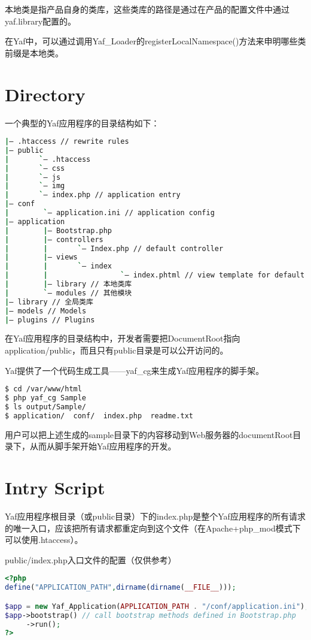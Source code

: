 本地类是指产品自身的类库，这些类库的路径是通过在产品的配置文件中通过yaf.library配置的。

在Yaf中，可以通过调用Yaf\_Loader的registerLocalNamespace()方法来申明哪些类前缀是本地类。



\section{Directory}


一个典型的Yaf应用程序的目录结构如下：

\begin{lstlisting}[language=bash]
|— .htaccess // rewrite rules
|— public
|       `— .htaccess
|       `— css
|       `— js
|       `— img
|       `— index.php // application entry
|— conf
|        `— application.ini // application config
|— application
|        |— Bootstrap.php
|        |— controllers
|        |       `— Index.php // default controller
|        |— views
|        |       `— index
|        |                 `— index.phtml // view template for default action
|        |— library // 本地类库
|        `— modules // 其他模块
|— library // 全局类库
|— models // Models
|— plugins // Plugins
\end{lstlisting}

在Yaf应用程序的目录结构中，开发者需要把DocumentRoot指向application/public，而且只有public目录是可以公开访问的。

Yaf提供了一个代码生成工具——yaf\_cg来生成Yaf应用程序的脚手架。


\begin{lstlisting}[language=bash]
$ cd /var/www/html
$ php yaf_cg Sample
$ ls output/Sample/
$ application/  conf/  index.php  readme.txt
\end{lstlisting}

用户可以把上述生成的sample目录下的内容移动到Web服务器的documentRoot目录下，从而从脚手架开始Yaf应用程序的开发。


\section{Intry Script}


Yaf应用程序根目录（或public目录）下的index.php是整个Yaf应用程序的所有请求的唯一入口，应该把所有请求都重定向到这个文件（在Apache+php\_mod模式下可以使用.htaccess）。


\begin{example}
public/index.php入口文件的配置（仅供参考）
\begin{lstlisting}[language=PHP]
<?php
define("APPLICATION_PATH",dirname(dirname(__FILE__)));

$app = new Yaf_Application(APPLICATION_PATH . "/conf/application.ini");
$app->bootstrap() // call bootstrap methods defined in Bootstrap.php
     ->run();
?>
\end{lstlisting}
\end{example}

